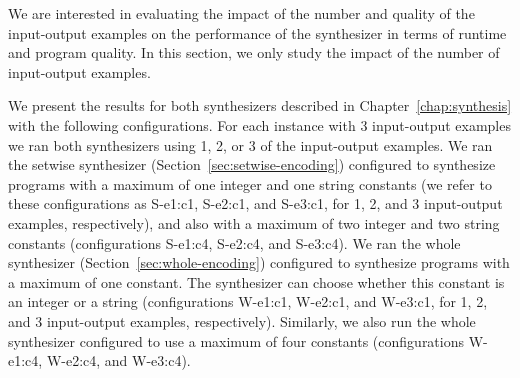 We are interested in evaluating the impact of the number and quality of the
input-output examples on the performance of the synthesizer in terms of runtime
and program quality.
In this section, we only study the impact of the number of input-output
examples.

We present the results for both synthesizers described in
Chapter~\ref{chap:synthesis} with the following configurations.
For each instance with 3 input-output examples we ran both synthesizers using 1,
2, or 3 of the input-output examples.
We ran the setwise synthesizer (Section~\ref{sec:setwise-encoding}) configured
to synthesize programs with a maximum of one integer and one string constants
(we refer to these configurations as S-e1:c1, S-e2:c1, and S-e3:c1, for 1, 2,
and 3 input-output examples, respectively), and also with a maximum of two
integer and two string constants (configurations S-e1:c4, S-e2:c4, and S-e3:c4).
We ran the whole synthesizer (Section~\ref{sec:whole-encoding}) configured to
synthesize programs with a maximum of one constant. The synthesizer can
choose whether this constant is an integer or a string (configurations W-e1:c1,
W-e2:c1, and W-e3:c1, for 1, 2, and 3 input-output examples, respectively).
Similarly, we also run the whole synthesizer configured to use a maximum of four
constants (configurations W-e1:c4, W-e2:c4, and W-e3:c4).


